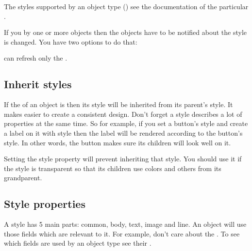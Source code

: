 \documentclass[letterpaper,10pt,english]{sphinxmanual}
\begin{document}
The styles supported by an object type  () see the documentation of the particular {\hyperref[\detokenize{object-types/index::doc}]{}}.

If you  by one or more objects then the objects have to be notified about the style is changed. You have two options to do that:

\begin{sphinxVerbatim}[commandchars=\\\{\}]
    

   
\end{sphinxVerbatim}

 can refresh only the .


\subsection{Inherit styles}
\label{\detokenize{overview/styles:inherit-styles}}
If the  of an object is  then its style will be inherited from its parent’s style. It makes easier to create a consistent design. Don’t forget a style describes a lot of properties at the same time. So for example, if you set a button’s style and create a label on it with  style then the label will be rendered according to the button’s style. In other words, the button makes sure its children will look well on it.

Setting the  style property will prevent inheriting that style. You should use it if the style is transparent so that its children use colors and others from its grandparent.


\subsection{Style properties}
\label{\detokenize{overview/styles:style-properties}}
A style has 5 main parts: common, body, text, image and line. An object will use those fields which are relevant to it.
For example,  don’t care about the .
To see which fields are used by an object type see their {\hyperref[\detokenize{object-types/index::doc}]{}}.
\end{document}
